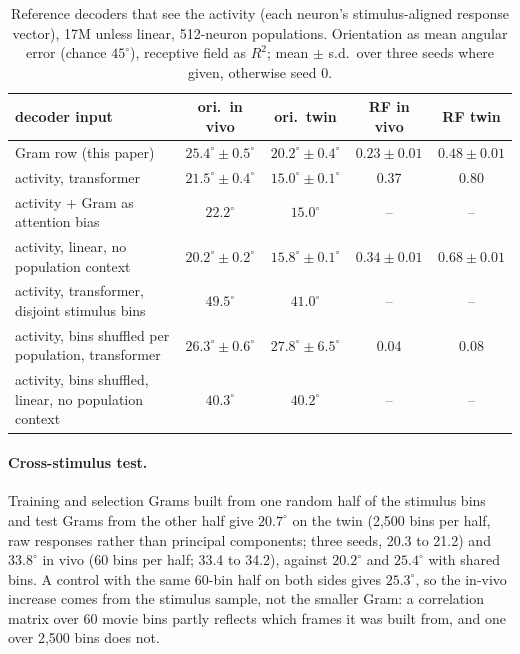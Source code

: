 \documentclass[11pt]{article}
\newcommand{\Rsq}{R^{2}}
\begin{document}
\begin{table}[htbp]
  \centering\footnotesize
  \caption{Reference decoders that see the activity (each neuron's stimulus-aligned response vector), 17M unless linear, 512-neuron populations. Orientation as mean angular error (chance $45^\circ$), receptive field as $\Rsq$; mean $\pm$ s.d.\ over three seeds where given, otherwise seed 0.}
  \label{tab:ref}
  \begin{tabular}{lcccc}
    \toprule
    decoder input & ori.\ in vivo & ori.\ twin & RF in vivo & RF twin \\
    \midrule
    Gram row (this paper) & $25.4^\circ \pm 0.5^\circ$ & $20.2^\circ \pm 0.4^\circ$ & $0.23 \pm 0.01$ & $0.48 \pm 0.01$ \\
    activity, transformer & $21.5^\circ \pm 0.4^\circ$ & $15.0^\circ \pm 0.1^\circ$ & 0.37 & 0.80 \\
    activity + Gram as attention bias & $22.2^\circ$ & $15.0^\circ$ & -- & -- \\
    activity, linear, no population context & $20.2^\circ \pm 0.2^\circ$ & $15.8^\circ \pm 0.1^\circ$ & $0.34 \pm 0.01$ & $0.68 \pm 0.01$ \\
    activity, transformer, disjoint stimulus bins & $49.5^\circ$ & $41.0^\circ$ & -- & -- \\
    activity, bins shuffled per population, transformer & $26.3^\circ \pm 0.6^\circ$ & $27.8^\circ \pm 6.5^\circ$ & 0.04 & 0.08 \\
    activity, bins shuffled, linear, no population context & $40.3^\circ$ & $40.2^\circ$ & -- & -- \\
    \bottomrule
  \end{tabular}
\end{table}

\paragraph{Cross-stimulus test.} Training and selection Grams built from one random half of the stimulus bins and test Grams from the other half give $20.7^\circ$ on the twin (2,500 bins per half, raw responses rather than principal components; three seeds, 20.3 to 21.2) and $33.8^\circ$ in vivo (60 bins per half; 33.4 to 34.2), against $20.2^\circ$ and $25.4^\circ$ with shared bins. A control with the same 60-bin half on both sides gives $25.3^\circ$, so the in-vivo increase comes from the stimulus sample, not the smaller Gram: a correlation matrix over 60 movie bins partly reflects which frames it was built from, and one over 2,500 bins does not.
\end{document}
